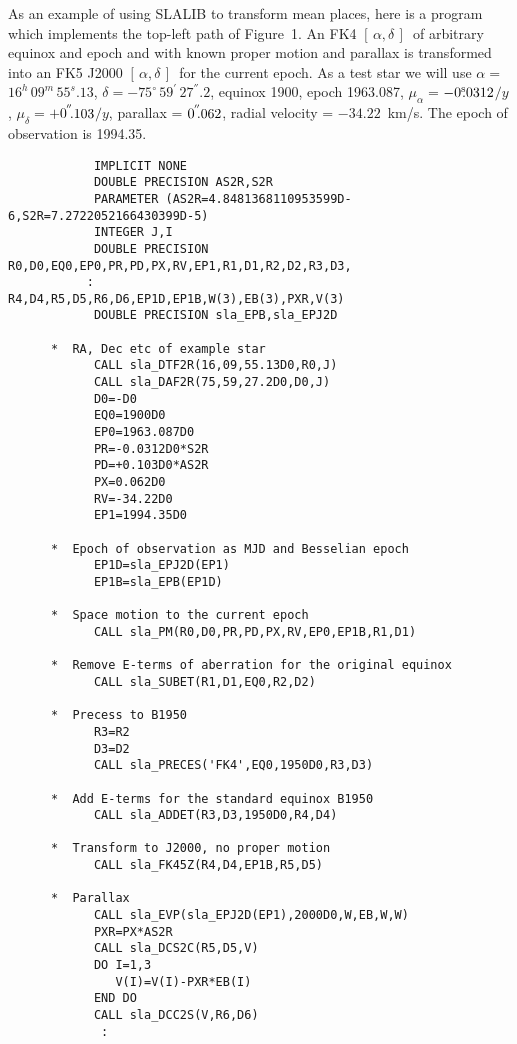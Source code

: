 \documentclass[11pt,twoside]{article}
\newcommand{\radec}     {$[\,\alpha,\delta\,]$}
\newcommand{\arcsec}[2] {\arcseci{#1}$\hspace{-0.4em}.#2$}
\newcommand{\arcsec}[2] {
      {$#1\hspace{-0.05em}^{'\hspace{-0.1em}'}\hspace{-0.4em}.#2$}
   }
\newcommand{\arcseci}[1] {$#1\hspace{-0.05em}$\raisebox{-0.5ex}
                         {$^{'\hspace{-0.1em}'}$}}
\renewcommand{\arcseci}[1] {$#1\hspace{-0.05em}^{'\hspace{-0.1em}'}$}
\newcommand{\dms}[4]    {$#1^{\circ}\,#2\raisebox{-0.5ex}
                        {$^{'}$}\,$\arcsec{#3}{#4}}
\renewcommand{\dms}[4]{$#1^{\circ}\,#2^{'}\,#3^{''}.#4$}
\newcommand{\tseci}[1]   {$#1$\mbox{$^{\rm s}$}}
\newcommand{\tsec}[2]    {\tseci{#1}$\hspace{-0.3em}.#2$}
\renewcommand{\tsec}[2] {$#1^{\rm s}\hspace{-0.3em}.#2$}
\newcommand{\hms}[4]    {$#1^{\rm h}\,#2^{\rm m}\,$\tsec{#3}{#4}}
\renewcommand{\hms}[4] {$#1^{h}\,#2^{m}\,#3^{s}.#4$}
\begin{document}
As an example of using SLALIB to transform mean places, here is
a program which implements the top-left path of Figure~1.
An FK4 \radec\ of arbitrary equinox and epoch and with
known proper motion and
parallax is transformed into an FK5 J2000 \radec\ for the current
epoch.  As a test star we will use $\alpha=$\hms{16}{09}{55}{13},
$\delta=$\dms{-75}{59}{27}{2}, equinox 1900, epoch 1963.087,
$\mu_\alpha=$\tsec{-0}{0312}$/y$, $\mu_\delta=$\arcsec{+0}{103}$/y$,
parallax = \arcsec{0}{062}, radial velocity = $-34.22$~km/s.  The
epoch of observation is 1994.35.
\goodbreak
\begin{verbatim}
            IMPLICIT NONE
            DOUBLE PRECISION AS2R,S2R
            PARAMETER (AS2R=4.8481368110953599D-6,S2R=7.2722052166430399D-5)
            INTEGER J,I
            DOUBLE PRECISION R0,D0,EQ0,EP0,PR,PD,PX,RV,EP1,R1,D1,R2,D2,R3,D3,
           :                 R4,D4,R5,D5,R6,D6,EP1D,EP1B,W(3),EB(3),PXR,V(3)
            DOUBLE PRECISION sla_EPB,sla_EPJ2D

      *  RA, Dec etc of example star
            CALL sla_DTF2R(16,09,55.13D0,R0,J)
            CALL sla_DAF2R(75,59,27.2D0,D0,J)
            D0=-D0
            EQ0=1900D0
            EP0=1963.087D0
            PR=-0.0312D0*S2R
            PD=+0.103D0*AS2R
            PX=0.062D0
            RV=-34.22D0
            EP1=1994.35D0

      *  Epoch of observation as MJD and Besselian epoch
            EP1D=sla_EPJ2D(EP1)
            EP1B=sla_EPB(EP1D)

      *  Space motion to the current epoch
            CALL sla_PM(R0,D0,PR,PD,PX,RV,EP0,EP1B,R1,D1)

      *  Remove E-terms of aberration for the original equinox
            CALL sla_SUBET(R1,D1,EQ0,R2,D2)

      *  Precess to B1950
            R3=R2
            D3=D2
            CALL sla_PRECES('FK4',EQ0,1950D0,R3,D3)

      *  Add E-terms for the standard equinox B1950
            CALL sla_ADDET(R3,D3,1950D0,R4,D4)

      *  Transform to J2000, no proper motion
            CALL sla_FK45Z(R4,D4,EP1B,R5,D5)

      *  Parallax
            CALL sla_EVP(sla_EPJ2D(EP1),2000D0,W,EB,W,W)
            PXR=PX*AS2R
            CALL sla_DCS2C(R5,D5,V)
            DO I=1,3
               V(I)=V(I)-PXR*EB(I)
            END DO
            CALL sla_DCC2S(V,R6,D6)
             :
\end{verbatim}
\end{document}
